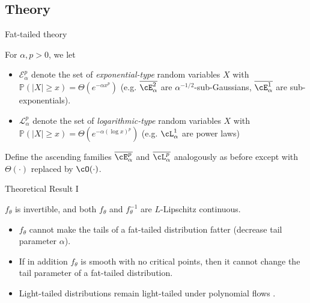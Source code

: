 \subsection{Theory}

\begin{subframe}{Fat-tailed theory}
    \begin{definition}
        \label{def:tail-classification}
        For $\alpha,p > 0$, we let 
        \vspace{-1mm}
        \begin{itemize}
            \item $\mathcal{E}_\alpha^p$ denote the set of \emph{exponential-type} random variables $X$ with $\mathbb{P}(|X| \geq x) = \Theta(e^{-\alpha x^p})$ (e.g.
            $\overline{\cE_\alpha^2}$ are $\alpha^{-1/2}$-sub-Gaussians, $\overline{\cE_\alpha^1}$ are sub-exponentials).
        \vspace{-1mm}
            \item $\mathcal{L}_\alpha^p$ denote the set of \emph{logarithmic-type} random variables $X$ with $\mathbb{P}(|X| \geq x) = \Theta(e^{-\alpha(\log x)^p})$ (e.g.
            $\cL^1_\alpha$ are power laws)
        \end{itemize}
        \vspace{-1mm}
        Define the ascending families
        $\overline{\cE_\alpha^p}$ and $\overline{\cL_\alpha^p}$
        analogously as before except with $\Theta(\cdot)$ replaced
        by $\cO(\cdot)$.
    \end{definition}
\end{subframe}

\begin{frame}{Theoretical Result I}
    \begin{assumption}\label{assump:lipschitz}
        $f_\theta$ is invertible, and both $f_\theta$ and $f^{-1}_\theta$
        are $L$-Lipschitz continuous.
    \end{assumption}
    \pause
    \begin{theorem}
      \label{thm:distn_class_closed}
      \begin{itemize}[<+->]
          \item $f_\theta$ cannot make the tails of a fat-tailed distribution fatter (decrease tail parameter $\alpha$).
          \item If in addition $f_\theta$ is smooth with no critical points, then it cannot change
            the tail parameter of a fat-tailed distribution.
          \item Light-tailed distributions remain light-tailed under polynomial flows \parencite{jaini2019sum}.
      \end{itemize}
    \end{theorem}
\end{frame}

